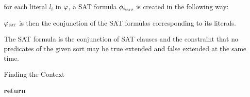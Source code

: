   



  for each literal $l_i$ in $\varphi$, a SAT formula ${\phi_{i_{\textsc{sat}}}}_{i}$ is created in the following way:

  $\varphi_{\textsc{sat}}$ is then the conjunction of the SAT formulas corresponding to its literals.
  

  
  The SAT formula is the conjunction of SAT clauses and the constraint that no 
  predicates of the given sort may be true extended and false extended at the same time.


  \begin{algorithm}[t]
\caption{Finding the Context}\label{alg:zoom} 
\begin{algorithmic}[1]
    \State \textbf{return}  

\EndProcedure

\EndProcedure
\end{algorithmic}
\end{algorithm}




  


